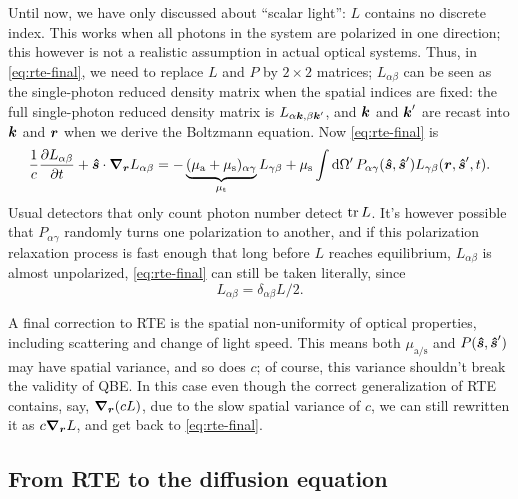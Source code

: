 \documentclass[hyperref, a4paper]{article}
\begin{document}
Until now, we have only discussed about ``scalar light'':
$L$ contains no discrete index.
This works when all photons in the system 
are polarized in one direction; 
this however is not a realistic assumption in actual optical systems.
Thus, in \eqref{eq:rte-final}, 
we need to replace $L$ and $P$ by $2 \times 2$ matrices;
$L_{\alpha \beta}$ can be seen as the single-photon reduced density matrix 
when the spatial indices are fixed:
the full single-photon reduced density matrix is 
$L_{\alpha \vb*{k}, \beta \vb*{k}'}$,
and $\vb*{k}$ and $\vb*{k}'$ are recast into $\vb*{k}$ and $\vb*{r}$ 
when we derive the Boltzmann equation.
Now \eqref{eq:rte-final} is 
\begin{equation}
    \frac{1}{c} \pdv{L_{\alpha \beta}}{t} + \vu*{s} \cdot \grad_{\vb*{r}} L_{\alpha \beta}
    = - \underbrace{(\mu_{\text{a}} + \mu_{\text{s}})_{\alpha \gamma}}_{\mu_{\text{t}}} L_{\gamma \beta} 
    + \mu_{\text{s}} \int \dd{\Omega'} 
    P_{\alpha \gamma}(\vu*{s}, \vu*{s}') L_{\gamma \beta}(\vb*{r}, \vu*{s}', t)  .
\end{equation} 
Usual detectors that only count photon number detect $\trace L$.
It's however possible that $P_{\alpha \gamma}$ randomly 
turns one polarization to another, 
and if this polarization relaxation process is fast enough 
that long before $L$ reaches equilibrium, 
$L_{\alpha \beta}$ is almost unpolarized,
\eqref{eq:rte-final} can still be taken literally, 
since 
\begin{equation}
    L_{\alpha \beta} = \delta_{\alpha \beta} L / 2.
\end{equation}

A final correction to RTE is the spatial non-uniformity of optical properties, 
including scattering and change of light speed. 
This means both $\mu_{\text{a/s}}$ and $P(\vu*{s}, \vu*{s}')$ 
may have spatial variance, 
and so does $c$; 
of course, this variance shouldn't break the validity of QBE. 
In this case even though the correct generalization of RTE contains, say, 
$\grad_{\vb*{r}} (c L)$, 
due to the slow spatial variance of $c$, 
we can still rewritten it as $c \grad_{\vb*{r}} L$, 
and get back to \eqref{eq:rte-final}.

\subsection{From RTE to the diffusion equation}
\end{document}
